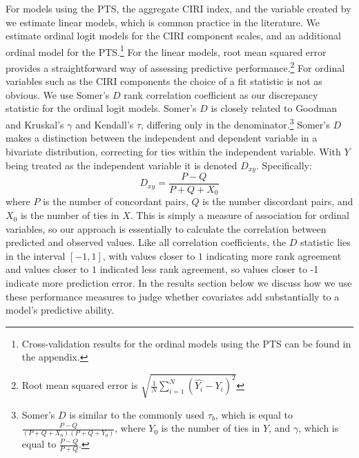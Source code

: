 \documentclass[12pt]{article}
\begin{document}
For models using the PTS, the aggregate CIRI index, and the variable created by \citet{Fariss2013} we estimate linear models, which is common practice in the literature. We estimate ordinal logit models for the CIRI component scales, and an additional ordinal model for the PTS.\footnote{Cross-validation results for the ordinal models using the PTS can be found in the appendix.} For the linear models, root mean squared error provides a straightforward way of assessing predictive performance.\footnote{Root mean squared error is $\displaystyle \sqrt{\frac{1}{N} \sum\limits_{i=1}^N (\hat{Y_{i}} - Y_{i})^2} $} For ordinal variables such as the CIRI components the choice of a fit statistic is not as obvious. We use Somer's $D$ rank correlation coefficient  \citep{Somers1962} as our discrepancy statistic for the ordinal logit models.
Somer's $D$ is closely related to Goodman and Kruskal's $\gamma$ and Kendall's $\tau$, differing only in the denominator.\footnote{Somer's $D$ is similar to the commonly used $\tau_b$, which is equal to $\frac{P - Q}{(P+Q+X_0)(P+Q+Y_0)}$, where $Y_0$ is the number of ties in $Y$, and $\gamma$, which is equal to $\frac{P - Q}{P + Q}$.} Somer's $D$ makes a distinction between the independent and dependent variable in a bivariate distribution, correcting for ties within the independent variable. With $Y$ being treated as the independent variable it is denoted $D_{xy}$. 
Specifically:
$$D_{xy} = \frac{P - Q}{P + Q + X_0}$$
\noindent where $P$ is the number of concordant pairs, $Q$ is the number discordant pairs, and $X_0$ is the number of ties in $X$. This is simply a measure of association for ordinal variables, so our approach is essentially to calculate the correlation between predicted and observed values. Like all correlation coefficients, the $D$ statistic lies in the interval $[-1, 1]$, with values closer to $1$ indicating more rank agreement and values closer to $1$ indicated less rank agreement, so values closer to -1 indicate more prediction error. In the results section below we discuss how we use these performance measures to judge whether covariates add substantially to a model's predictive ability.
\end{document}
